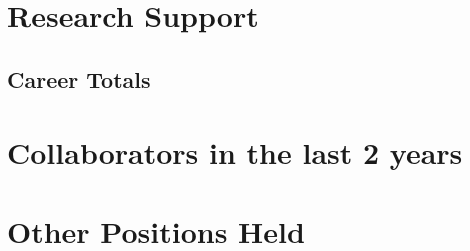 \documentclass[letter,10pt]{article}
\begin{document}
\section{Research Support}
\subsection{Career Totals}



\section{Collaborators in the last 2 years}


\section{Other Positions Held}

\end{document}

